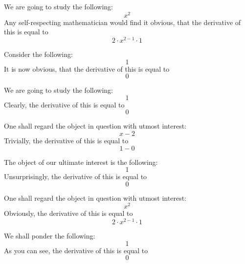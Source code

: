 \documentclass{article}
\begin{document}
We are going to study the following:
\begin{equation}
x ^{2 } 
\end{equation}
Any self-respecting mathematician would find it obvious, that the derivative of this is equal to
\begin{equation}
2 \cdot x ^{2 - 1 } \cdot 1 
\end{equation}

Consider the following:
\begin{equation}
1 
\end{equation}
It is now obvious, that the derivative of this is equal to
\begin{equation}
0 
\end{equation}

We are going to study the following:
\begin{equation}
1 
\end{equation}
Clearly, the derivative of this is equal to
\begin{equation}
0 
\end{equation}

One shall regard the object in question with utmost interest:
\begin{equation}
x - 2 
\end{equation}
Trivially, the derivative of this is equal to
\begin{equation}
1 - 0 
\end{equation}

The object of our ultimate interest is the following:
\begin{equation}
1 
\end{equation}
Unsurprisingly, the derivative of this is equal to
\begin{equation}
0 
\end{equation}

One shall regard the object in question with utmost interest:
\begin{equation}
x ^{2 } 
\end{equation}
Obviously, the derivative of this is equal to
\begin{equation}
2 \cdot x ^{2 - 1 } \cdot 1 
\end{equation}

We shall ponder the following:
\begin{equation}
1 
\end{equation}
As you can see, the derivative of this is equal to
\begin{equation}
0 
\end{equation}
\end{document}
